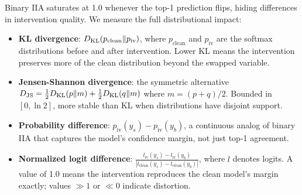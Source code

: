 Binary IIA saturates at 1.0 whenever the top-1 prediction flips, hiding
differences in intervention quality. We measure the full distributional impact:
\begin{itemize}[leftmargin=*]
\item \textbf{KL divergence}: $D_\mathrm{KL}(p_\text{clean} \| p_\text{iv})$, where
  $p_\text{clean}$ and $p_\text{iv}$ are the softmax distributions before and
  after intervention. Lower KL means the intervention preserves more of the
  clean distribution beyond the swapped variable.
\item \textbf{Jensen-Shannon divergence}: the symmetric alternative
  $D_\mathrm{JS} = \frac{1}{2}D_\mathrm{KL}(p \| m) + \frac{1}{2}D_\mathrm{KL}(q \| m)$ where $m = (p+q)/2$.
  Bounded in $[0, \ln 2]$, more stable than KL when distributions have disjoint
  support.
\item \textbf{Probability difference}: $p_\text{iv}(y_s) - p_\text{iv}(y_b)$,
  a continuous analog of binary IIA that captures the model's confidence margin,
  not just top-1 agreement.
\item \textbf{Normalized logit difference}:
  $\frac{l_\text{iv}(y_s) - l_\text{iv}(y_b)}{|l_\text{clean}(y_s) - l_\text{clean}(y_b)|}$,
  where $l$ denotes logits. A value of 1.0 means the intervention reproduces the
  clean model's margin exactly; values $\gg 1$ or $\ll 0$ indicate distortion.
\end{itemize}

